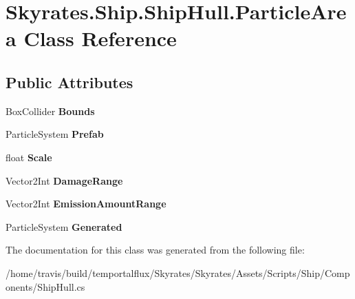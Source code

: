 \hypertarget{class_skyrates_1_1_ship_1_1_ship_hull_1_1_particle_area}{\section{Skyrates.\-Ship.\-Ship\-Hull.\-Particle\-Area Class Reference}
\label{class_skyrates_1_1_ship_1_1_ship_hull_1_1_particle_area}
}
\subsection*{Public Attributes}
\begin{DoxyCompactItemize}
\item 
\hypertarget{class_skyrates_1_1_ship_1_1_ship_hull_1_1_particle_area_a92d7890f1b1c1db05876796fb33ed072}{Box\-Collider {\bfseries Bounds}}\label{class_skyrates_1_1_ship_1_1_ship_hull_1_1_particle_area_a92d7890f1b1c1db05876796fb33ed072}

\item 
\hypertarget{class_skyrates_1_1_ship_1_1_ship_hull_1_1_particle_area_a47cbb8ba2e168c9c8672d0e685794367}{Particle\-System {\bfseries Prefab}}\label{class_skyrates_1_1_ship_1_1_ship_hull_1_1_particle_area_a47cbb8ba2e168c9c8672d0e685794367}

\item 
\hypertarget{class_skyrates_1_1_ship_1_1_ship_hull_1_1_particle_area_a89093e006f4c16955a2b4a587e595236}{float {\bfseries Scale}}\label{class_skyrates_1_1_ship_1_1_ship_hull_1_1_particle_area_a89093e006f4c16955a2b4a587e595236}

\item 
\hypertarget{class_skyrates_1_1_ship_1_1_ship_hull_1_1_particle_area_a6b839c5206cf686936e25ee49f1176d4}{Vector2\-Int {\bfseries Damage\-Range}}\label{class_skyrates_1_1_ship_1_1_ship_hull_1_1_particle_area_a6b839c5206cf686936e25ee49f1176d4}

\item 
\hypertarget{class_skyrates_1_1_ship_1_1_ship_hull_1_1_particle_area_a3f98460bc441de2a8f6257d211640d24}{Vector2\-Int {\bfseries Emission\-Amount\-Range}}\label{class_skyrates_1_1_ship_1_1_ship_hull_1_1_particle_area_a3f98460bc441de2a8f6257d211640d24}

\item 
\hypertarget{class_skyrates_1_1_ship_1_1_ship_hull_1_1_particle_area_aa2a752c77b09e3c2e876c7a8619b71a5}{Particle\-System {\bfseries Generated}}\label{class_skyrates_1_1_ship_1_1_ship_hull_1_1_particle_area_aa2a752c77b09e3c2e876c7a8619b71a5}

\end{DoxyCompactItemize}


The documentation for this class was generated from the following file\-:\begin{DoxyCompactItemize}
\item 
/home/travis/build/temportalflux/\-Skyrates/\-Skyrates/\-Assets/\-Scripts/\-Ship/\-Components/Ship\-Hull.\-cs\end{DoxyCompactItemize}
